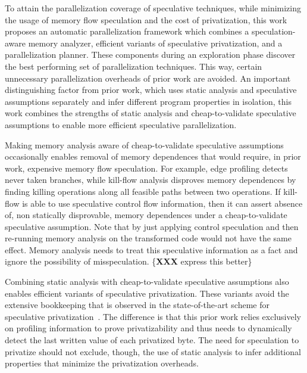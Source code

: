 To attain the parallelization coverage of speculative techniques,
while minimizing the usage of memory flow speculation and the cost of
privatization,
%
this work proposes an automatic parallelization framework which
combines a speculation-aware memory analyzer, efficient variants of
speculative privatization, and a parallelization planner. These
components during an exploration phase discover the best performing
set of parallelization techniques. This way, certain unnecessary
parallelization overheads of prior work are avoided.
%
An important distinguishing factor from prior work, which uses static
analysis and speculative assumptions separately and infer
different program properties in isolation, this work combines
the strengths of static analysis and cheap-to-validate speculative
assumptions to enable more efficient speculative parallelization.

Making memory analysis aware of cheap-to-validate speculative
assumptions occasionally enables removal of memory dependences that
would require, in prior work, expensive memory flow speculation.
%
For example, edge profiling detects never taken branches, while
kill-flow analysis disproves memory dependences by finding killing
operations along all feasible paths between two operations. If
kill-flow is able to use speculative control flow information, then it
can assert absence of, non statically disprovable, memory dependences
under a cheap-to-validate speculative assumption.
Note that by just applying control speculation and then re-running
memory analysis on the transformed code would not have the same
effect.  Memory analysis needs to treat this speculative information
as a fact and ignore the possibility of misspeculation.
\{\textbf{XXX} express this better\}

Combining static analysis with cheap-to-validate speculative
assumptions also enables efficient variants of speculative
privatization.
%
These variants avoid the extensive bookkeeping that is observed in the
state-of-the-art scheme for speculative privatization~\cite{johnson:12:pldi}.
%
The difference is that this prior work relies exclusively on profiling
information to prove privatizability and thus needs to dynamically
detect the last written value of each privatized byte.
%
The need for speculation to privatize should not exclude, though, the
use of static analysis to infer additional properties that minimize
the privatization overheads.

